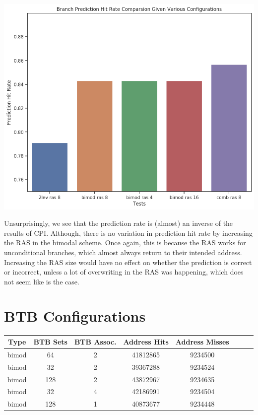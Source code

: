 \documentclass[twocolumn]{article}
\begin{document}
\begingroup
    \centering
    \medskip
    \includegraphics[width=0.68\columnwidth]{Lab-Tex/Lab9-images/hitRate.png}
    \label{fig:}
    \medskip
\endgroup

Unsurprisingly, we see that the prediction rate is (almost) an inverse of the results of CPI. Although, there is no variation in prediction hit rate by increasing the RAS in the bimodal scheme. Once again, this is because the RAS works for unconditional branches, which almost always return to their intended address. Increasing the RAS size would have no effect on whether the prediction is correct or incorrect, unless a lot of overwriting in the RAS was happening, which does not seem like is the case. \\

\newpage

\section{BTB Configurations}

\begingroup
    \medskip
    \centering
    \def\arraystretch{1.5}
        \scriptsize{
        \begin{tabular}{cccccccc}
            \toprule
            Type & BTB Sets & BTB Assoc. & Address Hits & Address Misses\\
             \midrule
            bimod & 64 & 2 & 41812865 & 9234500\\
            \midrule
            bimod & 32 & 2 & 39367288 & 9234524\\
            bimod & 128 & 2 & 43872967 & 9234635\\
            \midrule
            bimod & 32 & 4 & 42186991 & 9234504\\
            bimod & 128 & 1 & 40873677 & 9234448\\
            \bottomrule
        \end{tabular}
        }
    \label{table:btb}
    \medskip
\endgroup
\end{document}
